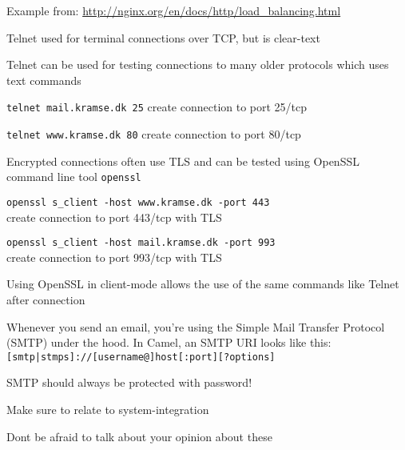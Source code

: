 \documentclass[Screen16to9,17pt]{foils}
\begin{document}
Example from:
\url{http://nginx.org/en/docs/http/load_balancing.html}




\begin{list1}
\item Telnet used for terminal connections over TCP, but is clear-text
\item Telnet can be used for testing connections to many older protocols which uses text commands
\begin{list2}
\item \verb+telnet mail.kramse.dk 25+ create connection to port 25/tcp
\item \verb+telnet www.kramse.dk 80+ create connection to port 80/tcp
\end{list2}
\item Encrypted connections often use TLS and can be tested using OpenSSL command line tool \verb+openssl+
\begin{list2}
\item \verb+openssl s_client -host www.kramse.dk -port 443+\\
create connection to port 443/tcp with TLS
\item \verb+openssl s_client -host mail.kramse.dk -port 993+\\
create connection to port 993/tcp with TLS
\end{list2}
\item Using OpenSSL in client-mode allows the use of the same commands like Telnet after connection
\end{list1}


Whenever you send an email, you’re using the Simple Mail Transfer Protocol (SMTP)
under the hood. In Camel, an SMTP URI looks like this:
\verb+[smtp|stmps]://[username@]host[:port][?options]+


SMTP should always be protected with password!


Make sure to relate to system-integration

Dont be afraid to talk about your opinion about these



\end{document}

